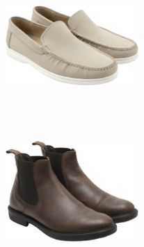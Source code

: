\documentclass[10pt]{article}
\begin{document}
\begin{minipage}[c][50.60mm][c]{50.60mm}
\includegraphics[width=50.60mm,height=50.60mm,keepaspectratio]{assets/shoes/mocassino-beige.png}\
\end{minipage} \hspace*{6.00mm} \begin{minipage}[c][50.60mm][c]{50.60mm}\centering
\includegraphics[width=50.60mm,height=50.60mm,keepaspectratio]{assets/shoes/brown-chelsea-boots.png}\
\end{minipage}\
\vspace*{6.00mm}\
\end{document}
